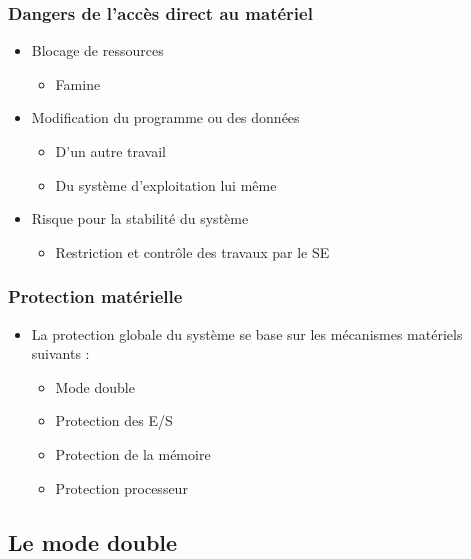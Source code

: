 \begin{frame}
 \frametitle{Dangers de l’accès direct au matériel}
 \begin{itemize}
 \item Blocage de ressources
\begin{itemize}
\item Famine
\end{itemize}
\item Modification du programme ou des données
\begin{itemize}
\item D’un autre travail
\item Du système d’exploitation lui même
\end{itemize}
\item Risque pour la stabilité du système
\begin{itemize}
\item Restriction et contrôle des travaux par le SE
\end{itemize}
 \end{itemize}
\end{frame}


\begin{frame}
\frametitle{Protection matérielle}
\begin{itemize}
\item La protection globale du système se base sur les mécanismes matériels suivants :
\begin{itemize}
\item Mode double
\item Protection des E/S
\item Protection de la mémoire
\item Protection processeur
\end{itemize}
\end{itemize}
\end{frame}


\subsection{Le mode double}

